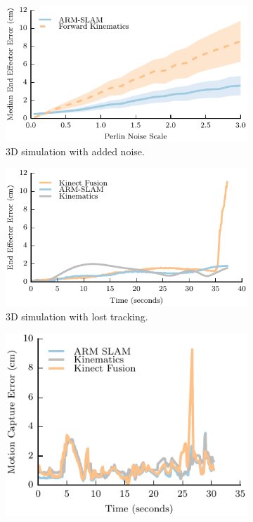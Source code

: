 \begin{figure}[ht]
\begin{subfigure}{0.5\columnwidth}
	\includegraphics[width=1.0\columnwidth]{img/arm_slam/added_noise.pdf} 
	\caption{3D simulation with added noise.}
	\label{fig:3d_exp_added_noise}
\end{subfigure}
\begin{subfigure}{0.5\columnwidth}
	\includegraphics[width=1.0\columnwidth]{img/arm_slam/3d_kinfu_error.pdf} 
	\caption{3D simulation with lost tracking.}
	\label{fig:3d_exp_kinfu}
\end{subfigure} 
\begin{subfigure}{0.5\columnwidth}
	\includegraphics[width=1.0\columnwidth]{img/arm_slam/motion_track.pdf} 

\end{subfigure}
\end{figure}
